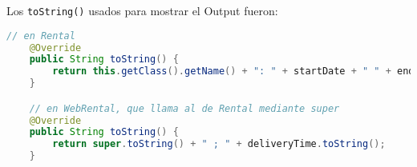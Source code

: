 \vspace{1cm}

Los \texttt{toString()} usados para mostrar el Output fueron:


\begin{lstlisting}[style = javaEspecifico, language=Java] 
    // en Rental
    @Override
    public String toString() {
        return this.getClass().getName() + ": " + startDate + " " + endDate+"\n";
    }

    // en WebRental, que llama al de Rental mediante super
    @Override
    public String toString() {
        return super.toString() + " ; " + deliveryTime.toString();
    }
\end{lstlisting}